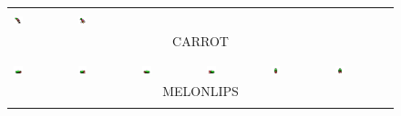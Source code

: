 \documentclass[book.tex]{subfiles}
\begin{document}
\begin{figure}[H]
\begin{table}[H]
\begin{tabularx}{\textwidth}[c]{|XXXXXX|}
  \includegraphics[width=0.17\textwidth]{screenshots_300dpi/game/sprite4e.png} & 
  \includegraphics[width=0.17\textwidth]{screenshots_300dpi/game/sprite4f.png} & & \\
  \multicolumn{6}{|c|}{CARROT}  \\ \hline
  \multicolumn{6}{c}{}   \\ \hline
  
  \includegraphics[width=0.17\textwidth]{screenshots_300dpi/game/sprite5a.png} &
  \includegraphics[width=0.17\textwidth]{screenshots_300dpi/game/sprite5b.png} &  
  \includegraphics[width=0.17\textwidth]{screenshots_300dpi/game/sprite5c.png} &
  \includegraphics[width=0.17\textwidth]{screenshots_300dpi/game/sprite5d.png} &  
  \includegraphics[width=0.17\textwidth]{screenshots_300dpi/game/sprite5e.png} &
  \includegraphics[width=0.17\textwidth]{screenshots_300dpi/game/sprite5f.png} \\
  \multicolumn{6}{|c|}{MELONLIPS}  \\ \hline
  \multicolumn{6}{c}{}    \\ \hline  
  

\end{tabularx}
\end{table}
\end{figure}
\end{document}
